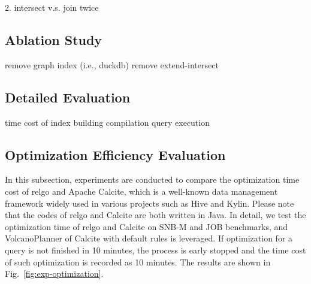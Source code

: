 2. intersect v.s. join twice


\subsection{Ablation Study}
\label{sec:experiment-ablation}

remove graph index (i.e., duckdb)
remove extend-intersect


\subsection{Detailed Evaluation}
\label{sec:experiment-detail}

time cost of index building
compilation
query execution

\subsection{Optimization Efficiency Evaluation}
\label{sec:experiment-optimize}

In this subsection, experiments are conducted to compare the optimization time cost of relgo and Apache Calcite, which is a well-known data management framework widely used in various projects such as Hive and Kylin.
Please note that the codes of relgo and Calcite are both written in Java.
In detail, we test the optimization time of relgo and Calcite on SNB-M and JOB benchmarks, and VolcanoPlanner of Calcite with default rules is leveraged.
If optimization for a query is not finished in 10 minutes, the process is early stopped and the time cost of such optimization is recorded as 10 minutes.
The results are shown in Fig.~\ref{fig:exp-optimization}.

